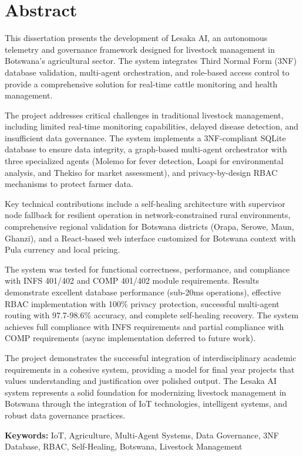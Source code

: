 
\chapter*{Abstract}

This dissertation presents the development of Lesaka AI, an autonomous telemetry and governance framework designed for livestock management in Botswana's agricultural sector. The system integrates Third Normal Form (3NF) database validation, multi-agent orchestration, and role-based access control to provide a comprehensive solution for real-time cattle monitoring and health management.

The project addresses critical challenges in traditional livestock management, including limited real-time monitoring capabilities, delayed disease detection, and insufficient data governance. The system implements a 3NF-compliant SQLite database to ensure data integrity, a graph-based multi-agent orchestrator with three specialized agents (Molemo for fever detection, Loapi for environmental analysis, and Thekiso for market assessment), and privacy-by-design RBAC mechanisms to protect farmer data.

Key technical contributions include a self-healing architecture with supervisor node fallback for resilient operation in network-constrained rural environments, comprehensive regional validation for Botswana districts (Orapa, Serowe, Maun, Ghanzi), and a React-based web interface customized for Botswana context with Pula currency and local pricing.

The system was tested for functional correctness, performance, and compliance with INFS 401/402 and COMP 401/402 module requirements. Results demonstrate excellent database performance (sub-20ms operations), effective RBAC implementation with 100\% privacy protection, successful multi-agent routing with 97.7-98.6\% accuracy, and complete self-healing recovery. The system achieves full compliance with INFS requirements and partial compliance with COMP requirements (async implementation deferred to future work).

The project demonstrates the successful integration of interdisciplinary academic requirements in a cohesive system, providing a model for final year projects that values understanding and justification over polished output. The Lesaka AI system represents a solid foundation for modernizing livestock management in Botswana through the integration of IoT technologies, intelligent systems, and robust data governance practices.

\textbf{Keywords:} IoT, Agriculture, Multi-Agent Systems, Data Governance, 3NF Database, RBAC, Self-Healing, Botswana, Livestock Management
